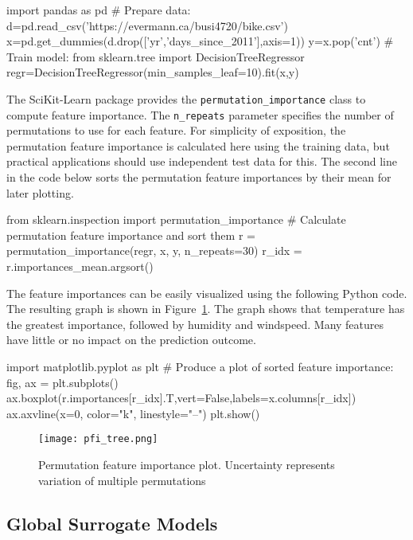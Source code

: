 \begin{pythoncode}
import pandas as pd
# Prepare data:
d=pd.read_csv('https://evermann.ca/busi4720/bike.csv')
x=pd.get_dummies(d.drop(['yr','days_since_2011'],axis=1))
y=x.pop('cnt')
# Train model:
from sklearn.tree import DecisionTreeRegressor
regr=DecisionTreeRegressor(min_samples_leaf=10).fit(x,y)
\end{pythoncode}

The SciKit-Learn package provides the \texttt{permutation\_importance} class to compute feature importance. The \texttt{n\_repeats} parameter specifies the number of permutations to use for each feature. For simplicity of exposition, the permutation feature importance is calculated here using the training data, but practical applications should use independent test data for this. The second line in the code below sorts the permutation feature importances by their mean for later plotting.

\begin{pythoncode}
from sklearn.inspection import permutation_importance
# Calculate permutation feature importance and sort them
r = permutation_importance(regr, x, y, n_repeats=30)
r_idx = r.importances_mean.argsort()
\end{pythoncode}

The feature importances can be easily visualized using the following Python code. The resulting graph is shown in Figure~\ref{fig:pfi}. The graph shows that temperature has the greatest importance, followed by humidity and windspeed. Many features have little or no impact on the prediction outcome.

\begin{pythoncode}
import matplotlib.pyplot as plt
# Produce a plot of sorted feature importance:
fig, ax = plt.subplots()
ax.boxplot(r.importances[r_idx].T,vert=False,labels=x.columns[r_idx])
ax.axvline(x=0, color="k", linestyle="--")
plt.show()
\end{pythoncode}

\begin{figure}
\centering

\texttt{[image: pfi\_tree.png]} \\
\caption[Permutation feature importance plot]{Permutation feature importance plot. Uncertainty represents variation of multiple permutations}
\label{fig:pfi}
\end{figure}

\subsection{Global Surrogate Models}

